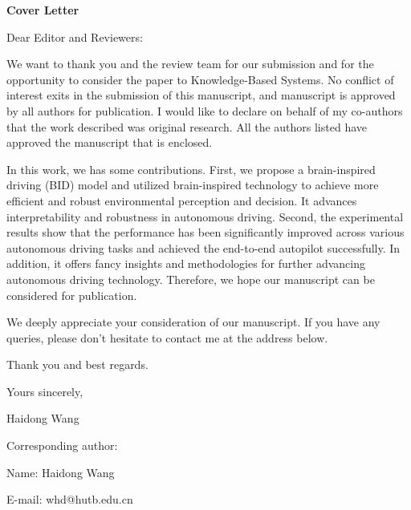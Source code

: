 \documentclass[11pt,journal,onecolumn,draft]{IEEEtran}
\begin{document}
\begin{center}
	\textbf{\LARGE Cover Letter} 
\end{center}
\vspace{8pt} 
Dear Editor and Reviewers:

\hspace{1em} We want to thank you and the review team for  our submission and for the opportunity to consider the paper to Knowledge-Based Systems.  
No conflict of interest exits in the submission of this manuscript, and manuscript is approved by all authors for publication.  
I would like to declare on behalf of my co-authors that the work described was original research. 
All the authors listed have approved the manuscript that is enclosed. 

In this work, we has some contributions.
First, we propose a brain-inspired driving (BID) model and utilized brain-inspired technology to achieve more efficient and robust environmental perception and decision. It advances interpretability and robustness in autonomous driving.
Second, the experimental results show that the performance has been significantly improved across various autonomous driving tasks and achieved the end-to-end autopilot successfully. 
In addition, it offers fancy insights and methodologies for further advancing autonomous driving technology.
Therefore, we hope our manuscript can be considered for publication. 

\hspace{1em} We deeply appreciate your consideration of our manuscript.
If you have any queries, please don’t hesitate to contact me at the address below.

\hspace{1em} Thank you and best regards.

\hspace{1em} Yours sincerely,

\hspace{1em} Haidong Wang
\vspace{20pt} 

Corresponding author:

Name: Haidong Wang

E-mail: whd@hutb.edu.cn 
\end{document}
